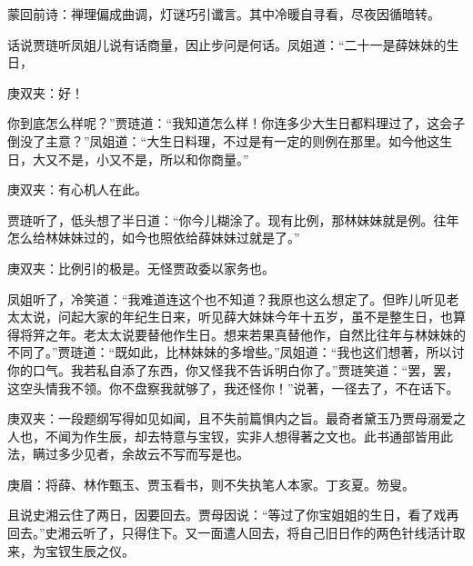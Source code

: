 
\begin{parag}
    \begin{note}蒙回前诗：禅理偏成曲调，灯谜巧引谶言。其中冷暖自寻看，尽夜因循暗转。\end{note}
\end{parag}


\begin{parag}
    话说贾琏听凤姐儿说有话商量，因止步问是何话。凤姐道：“二十一是薛妹妹的生日，\begin{note}庚双夹：好！\end{note}你到底怎么样呢？”贾琏道：“我知道怎么样！你连多少大生日都料理过了，这会子倒没了主意？”凤姐道：“大生日料理，不过是有一定的则例在那里。如今他这生日，大又不是，小又不是，所以和你商量。”\begin{note}庚双夹：有心机人在此。\end{note}贾琏听了，低头想了半日道：“你今儿糊涂了。现有比例，那林妹妹就是例。往年怎么给林妹妹过的，如今也照依给薛妹妹过就是了。”\begin{note}庚双夹：比例引的极是。无怪贾政委以家务也。\end{note}凤姐听了，冷笑道：“我难道连这个也不知道？我原也这么想定了。但昨儿听见老太太说，问起大家的年纪生日来，听见薛大妹妹今年十五岁，虽不是整生日，也算得将笄之年。老太太说要替他作生日。想来若果真替他作，自然比往年与林妹妹的不同了。”贾琏道：“既如此，比林妹妹的多增些。”凤姐道：“我也这们想著，所以讨你的口气。我若私自添了东西，你又怪我不告诉明白你了。”贾琏笑道：“罢，罢，这空头情我不领。你不盘察我就够了，我还怪你！”说著，一径去了，不在话下。\begin{note}庚双夹：一段题纲写得如见如闻，且不失前篇惧内之旨。最奇者黛玉乃贾母溺爱之人也，不闻为作生辰，却去特意与宝钗，实非人想得著之文也。此书通部皆用此法，瞒过多少见者，余故云不写而写是也。\end{note}\begin{note}庚眉：将薛、林作甄玉、贾玉看书，则不失执笔人本家。丁亥夏。笏叟。\end{note}
\end{parag}


\begin{parag}
    且说史湘云住了两日，因要回去。贾母因说：“等过了你宝姐姐的生日，看了戏再回去。”史湘云听了，只得住下。又一面遣人回去，将自己旧日作的两色针线活计取来，为宝钗生辰之仪。
\end{parag}


